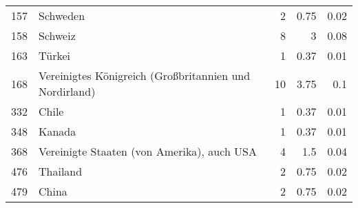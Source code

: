 \begin{longtable}{lXrrr}
        157 & \multicolumn{1}{X}{Schweden} & %
          \num{2} &
          \num[round-mode=places,round-precision=2]{0.75} &
          \num[round-mode=places,round-precision=2]{0.02} \\

        158 & \multicolumn{1}{X}{Schweiz} & %
          \num{8} &
          \num[round-mode=places,round-precision=2]{3} &
          \num[round-mode=places,round-precision=2]{0.08} \\

        163 & \multicolumn{1}{X}{Türkei} & %
          \num{1} &
          \num[round-mode=places,round-precision=2]{0.37} &
          \num[round-mode=places,round-precision=2]{0.01} \\

        168 & \multicolumn{1}{X}{Vereinigtes Königreich (Großbritannien und Nordirland)} & %
          \num{10} &
          \num[round-mode=places,round-precision=2]{3.75} &
          \num[round-mode=places,round-precision=2]{0.1} \\

        332 & \multicolumn{1}{X}{Chile} & %
          \num{1} &
          \num[round-mode=places,round-precision=2]{0.37} &
          \num[round-mode=places,round-precision=2]{0.01} \\

        348 & \multicolumn{1}{X}{Kanada} & %
          \num{1} &
          \num[round-mode=places,round-precision=2]{0.37} &
          \num[round-mode=places,round-precision=2]{0.01} \\

        368 & \multicolumn{1}{X}{Vereinigte Staaten (von Amerika), auch USA} & %
          \num{4} &
          \num[round-mode=places,round-precision=2]{1.5} &
          \num[round-mode=places,round-precision=2]{0.04} \\

        476 & \multicolumn{1}{X}{Thailand} & %
          \num{2} &
          \num[round-mode=places,round-precision=2]{0.75} &
          \num[round-mode=places,round-precision=2]{0.02} \\

        479 & \multicolumn{1}{X}{China} & %
          \num{2} &
          \num[round-mode=places,round-precision=2]{0.75} &
          \num[round-mode=places,round-precision=2]{0.02} \\


\end{longtable}
